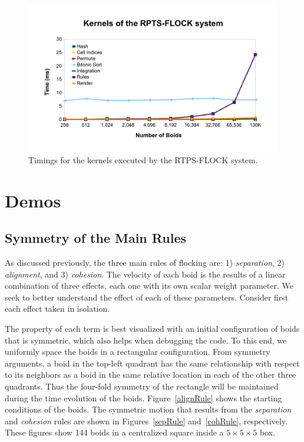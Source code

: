 \begin{figure}[htbp]
\begin{center}
\includegraphics[scale=0.7]{figures/kernelsPlot.pdf}
\caption{Timings for the kernels executed by the RTPS-FLOCK system.}
\label{kernelBench}
\end{center}
\end{figure}


\section{Demos}

\subsection{Symmetry of the Main Rules}
As discussed previously, the three main rules of flocking are: 1) \textit{separation}, 2) \textit{alignment}, and 3) \textit{cohesion}. The velocity of each boid is the results of a linear combination of three effects, each one with its own scalar weight parameter. We seek to better understand the effect of each of these parameters. Consider first each effect taken in isolation.

The property of each term is best visualized with an initial configuration of boids that is symmetric, which also helps when debugging the code. To this end, we uniformly space the boids in a rectangular configuration.  From symmetry arguments, a boid in the top-left quadrant has the same relationship with respect to its neighbors as a boid in the same relative location in each of the other three quadrants. Thus the four-fold symmetry of the rectangle will be maintained during the time evolution of the boids. Figure~\ref{alignRule} shows the starting conditions of the boids. The symmetric motion that results from the \textit{separation} and \textit{cohesion} rules are shown in Figures~\ref{sepRule} and~\ref{cohRule}, respectively. These figures show 144 boids in a centralized square inside a $5\times 5\times 5$ box.

